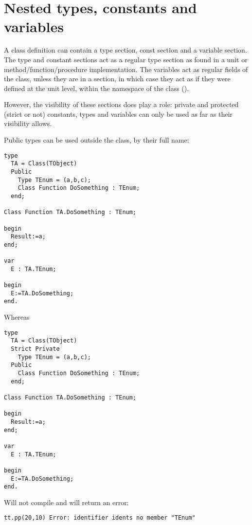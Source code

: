 
\section{Nested types, constants and variables}
A class definition can contain a type section, const section and a variable section.
The type and constant sections act as a regular type section as found in a unit or 
method/function/procedure implementation. The variables act as regular fields of the 
class, unless they are in a  section, in which case they act as if they 
were defined at the unit level, within the namespace of the class ().

However, the visibility of these sections does play a role: private and protected 
(strict or not) constants, types and variables can only be used as far as their 
visibility allows.

Public types can be used outside the class, by their full name:
\begin{verbatim}
type
  TA = Class(TObject)
  Public
    Type TEnum = (a,b,c);
    Class Function DoSomething : TEnum;
  end;
  
Class Function TA.DoSomething : TEnum;

begin
  Result:=a;
end;

var
  E : TA.TEnum;
  
begin
  E:=TA.DoSomething;
end.
\end{verbatim}
Whereas
\begin{verbatim}
type
  TA = Class(TObject)
  Strict Private
    Type TEnum = (a,b,c);
  Public
    Class Function DoSomething : TEnum;
  end;
  
Class Function TA.DoSomething : TEnum;

begin
  Result:=a;
end;

var
  E : TA.TEnum;
  
begin
  E:=TA.DoSomething;
end.
\end{verbatim}
Will not compile and will return an error:
\begin{verbatim}
tt.pp(20,10) Error: identifier idents no member "TEnum"
\end{verbatim}

